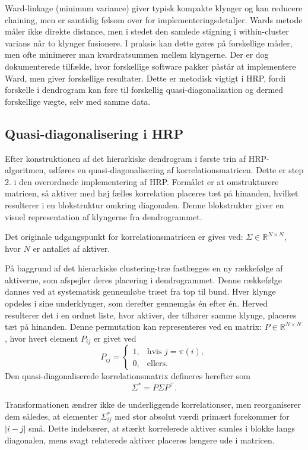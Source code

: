 \documentclass[../main.tex]{subfiles}
\begin{document}
Ward-linkage (minimum variance) giver typisk kompakte klynger og kan reducere chaining, men er samtidig følsom over for implementeringsdetaljer. Wards metode måler ikke direkte distance, men i stedet den samlede stigning i within-cluster varians når to klynger fusionere. I praksis kan dette gøres på forskellige måder, men ofte minimerer man kvardratsummen mellem klyngerne. Der er dog dokumenterede tilfælde, hvor forskellige software pakker påstår at implementere Ward, men giver forskellige resultater. Dette er metodisk vigtigt i HRP, fordi forskelle i dendrogram kan føre til forskellig quasi-diagonalization og dermed forskellige vægte, selv med samme data.~\cite{murtagh_legendre_ward_2014}

\subsection{Quasi-diagonalisering i HRP}

Efter konstruktionen af det hierarkiske dendrogram i første trin af HRP-algoritmen, udføres en quasi-diagonalisering af korrelationsmatricen. Dette er step 2. i den overordnede implementering af HRP. Formålet er at omstrukturere matricen, så aktiver med høj fælles korrelation placeres tæt på hinanden, hvilket resulterer i en blokstruktur omkring diagonalen. Denne blokstrukter giver en visuel representation af klyngerne fra dendrogrammet.

Det originale udgangspunkt for korrelationsmatricen er gives ved: $\Sigma \in \mathbb{R}^{N \times N}$, hvor $N$ er antallet af aktiver. 

På baggrund af det hierarkiske clustering-træ fastlægges en ny rækkefølge af aktiverne, som afspejler deres placering i dendrogrammet. Denne rækkefølge dannes ved at systematisk gennemløbe træet fra top til bund. Hver klynge opdeles i sine underklynger, som derefter gennemgås én efter én. Herved resulterer det i en ordnet liste, hvor aktiver, der tilhører samme klynge, placeres tæt på hinanden. Denne permutation kan representeres ved en matrix: $P \in \mathbb{R}^{N \times N}$, hvor hvert element $P_{ij}$ er givet ved
\[
P_{ij} =
\begin{cases}
1, & \text{hvis } j = \pi(i), \\
0, & \text{ellers}.
\end{cases}
\]
Den quasi-diagonaliserede korrelationsmatrix defineres herefter som
\[
\Sigma^{*} = P \Sigma P^{\top}.
\]

Transformationen ændrer ikke de underliggende korrelationser, men reorganiserer dem således, at elementer $\Sigma^{*}_{ij}$ med stor absolut værdi primært forekommer for $|i - j|$ små. Dette indebærer, at stærkt korrelerede aktiver samles i blokke langs diagonalen, mens svagt relaterede aktiver placeres længere ude i matricen.
\end{document}
